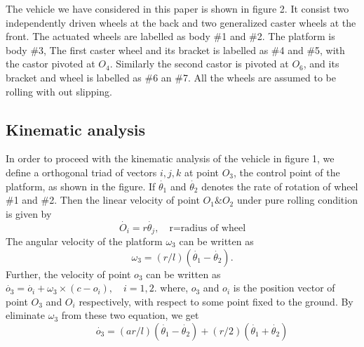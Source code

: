  The vehicle we have considered in this paper is shown in figure 2. It consist two independently driven wheels at the back and two generalized caster wheels at the front. The actuated wheels are labelled as body \#1 and \#2. The platform is body \#3, The first caster wheel and its bracket is labelled as \#4 and \#5, with the castor pivoted at $O_4$. Similarly the second castor is pivoted at $O_6$, and its bracket and wheel is labelled as \#6 an \#7. All the wheels are assumed to be rolling with out slipping.  
\subsection{Kinematic analysis}
In order to proceed with the kinematic analysis of the vehicle in figure 1, we define a orthogonal triad of vectors ${i,j,k}$ at point $O_3$, the control point of the platform, as shown in the figure. If $\dot{\theta_1}$ and $\dot{\theta_2}$ denotes the rate of rotation of wheel \#1 and \#2. Then the linear velocity of point $O_1\&O_2$ under pure rolling condition is given by 
\begin{equation}
\label{velO1}
\dot{O_i}=r\dot{\theta_j}, \quad \text{r=radius of wheel}
\end{equation}
The angular velocity of the platform $\omega_3$ can be written as 
\begin{equation}
\label{omegaPlat}
\omega_3=(r/l)(\dot{\theta_1}-\dot{\theta_2}).
\end{equation}
Further, the velocity of point $o_3$ can be written as
$\dot{o_3}=\dot{o_i}+\omega_3 \times (c-o_i), \quad i=1,2$. where, $o_3 $ and $o_i$  is the position vector of point $O_3$ and $O_i$ respectively, with respect to some  point fixed to the ground. By eliminate $\omega_3$ from  these two equation, we get
\begin{equation}
\label{velPlat}
 \quad \quad \dot{o_3}=(ar/l)(\dot{\theta_1}-\dot{\theta_2})+(r/2)(\dot{\theta_1}+\dot{\theta_2})
\end{equation}

